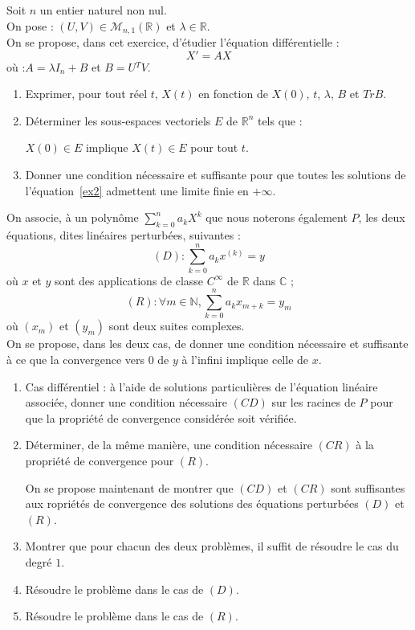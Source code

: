\begin{exer}
Soit $n$ un entier naturel non nul.\\
On pose : $(U,V)\in\mathcal{M}_{n,1}(\mathbb{R})$ et $\lambda\in\mathbb{R}$.\\
On se propose, dans cet exercice, d'\'etudier l'\'equation diff\'erentielle :
\begin{equation}
X'=AX
\label{ex2}
\end{equation}
o\`u :$A=\lambda I_n+B$ et $B=U{}^TV$.
\begin{enumerate}
\item Exprimer, pour tout r\'eel $t$, $X(t)$ en fonction de $X(0)$, $t$, $\lambda$, $B$ et $Tr B$.
\item D\'eterminer les sous-espaces vectoriels $E$ de $\mathbb{R}^n$ tels que :

\smallskip
$X(0)\in E$ implique $X(t)\in E$ pour tout $t$.
\item Donner une condition n\'ecessaire et suffisante pour que toutes les solutions de l'\'equation~\eqref{ex2} admettent une limite finie en $+\infty$.
\end{enumerate}
\end{exer}

\begin{exer}
On associe, à un polynôme $\sum\limits_{k=0}^n a_k X^k$ que nous noterons également $P$, les deux équations, dites linéaires perturbées, suivantes :
\[(D) : \sum\limits_{k=0}^n a_k x^{(k)} = y\] où $x$ et $y$ sont des applications de classe $C^{\infty}$ de $\mathbb{R}$ dans $\mathbb{C}$ ;
\[(R) : \forall m \in \mathbb{N} , \sum\limits_{k=0}^n a_k x_{m+k} = y_m\] où $(x_m)$ et $(y_m)$ sont deux suites complexes.\\
On se propose, dans les deux cas, de donner une condition nécessaire et suffisante à ce que la convergence vers $0$ de $y$ à l'infini implique celle de $x$.
\begin{enumerate}
\item Cas différentiel : \`a l'aide de solutions particuli\`eres de l'équation linéaire associée, donner une condition nécessaire $(CD)$ sur les racines de $P$ pour que la propriété de convergence considérée soit vérifiée.
\item D\'eterminer, de la m\^eme mani\`ere, une condition nécessaire $(CR)$ à la propriété de convergence pour $(R)$.

\smallskip
On se propose maintenant de montrer que $(CD)$ et $(CR)$ sont suffisantes aux ropriétés de convergence des solutions des équations perturbées $(D)$ et $(R)$.\\
\item Montrer que pour chacun des deux problèmes, il suffit de résoudre le cas du degré $1$.
\item Résoudre le problème dans le cas de $(D)$.
\item Résoudre le problème dans le cas de $(R)$.
\end{enumerate}
\end{exer}

